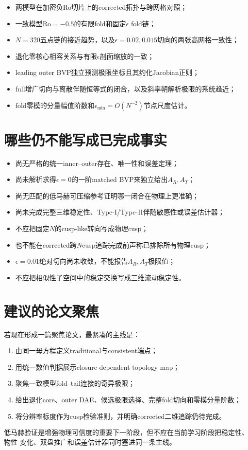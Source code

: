 \documentclass[UTF8,zihao=-4,openany]{ctexbook}
\newcommand{\eps}{\epsilon}
\newcommand{\Ro}{\mathrm{Ro}}
\begin{document}
\begin{itemize}
  \item 两模型在加密负$\Ro$切片上的corrected拓扑与跨网格对照；
 \item 一致模型$\Ro=-0.5$的有限fold和固定$\eps$ fold链；
 \item $N=320$五点链的接近趋势，以及$\eps=0.02,0.015$切向的两张高网格一致性；
 \item 退化零核心相容关系与有限$\eps$剖面缩放的一致；
 \item leading outer BVP独立预测极限坐标且其约化Jacobian正则；
 \item full增广切向与离散伴随恒等式的闭合，以及斜率朝解析极限的系统趋近；
 \item fold零模的分量幅值阶数和$\eps_{\min}=O(N^{-2})$节点尺度估计。
\end{itemize}

\section{哪些仍不能写成已完成事实}

\begin{itemize}
 \item 尚无严格的统一inner--outer存在、唯一性和误差定理；
 \item 尚未解析求得$\eps=0$的一阶matched BVP来独立给出$A_R,A_T$；
 \item 尚无匹配的低马赫可压缩参考证明哪一闭合在物理上更准确；
 \item 尚未完成完整三维稳定性、Type-I/Type-II伴随敏感性或误差估计器；
 \item 不应把固定$N$的cusp-like转向写成物理cusp；
 \item 也不能在corrected跨$N$cusp追踪完成前声称已排除所有物理cusp；
 \item $\eps=0.01$绝对切向尚未收敛，不能报告$A_R,A_T$极限值；
 \item 不应把相似性子空间中的稳定交换写成三维流动稳定性。
\end{itemize}

\section{建议的论文聚焦}

若现在形成一篇聚焦论文，最紧凑的主线是：
\begin{enumerate}
 \item 由同一母方程定义traditional与consistent端点；
 \item 用统一数值判据展示closure-dependent topology map；
 \item 聚焦一致模型fold--tail连接的奇异极限；
 \item 给出退化core、outer DAE、候选极限选择、完整fold切向和零模分量阶数；
 \item 将分辨率标度作为cusp检验准则，并明确corrected二维追踪仍待完成。
\end{enumerate}
低马赫验证是增强物理可信度的重要下一阶段，但不应在当前学习阶段把稳定性、物性
变化、双盘推广和误差估计器同时塞进同一条主线。
\end{document}

